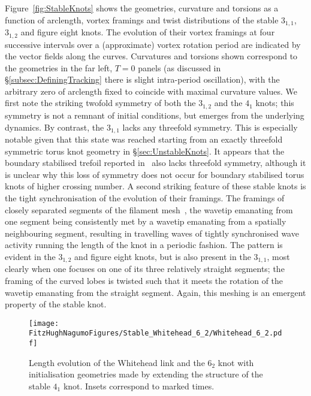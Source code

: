 Figure~\ref{fig:StableKnots} shows the geometries, curvature and torsions as a function of arclength, vortex framings and twist distributions of the stable $3_{1,1}$, $3_{1,2}$ and figure eight knots. The evolution of their vortex framings at four successive intervals over a (approximate) vortex rotation period are indicated by the vector fields along the curves. Curvatures and torsions shown correspond to the geometries in the far left, $T=0$ panels (as discussed in \S \ref{subsec:DefiningTracking} there is slight intra-period oscillation), with the arbitrary zero of arclength fixed to coincide with maximal curvature values. We first note the striking twofold symmetry of both the $3_{1,2}$ and the $4_1$ knots; this symmetry is not a remnant of initial conditions, but emerges from the underlying dynamics. By contrast, the $3_{1,1}$ lacks any threefold symmetry. This is especially notable given that this state was reached starting from an exactly threefold symmetric torus knot geometry in \S \ref{sec:UnstableKnots}. It appears that the boundary stabilised trefoil reported in~\citep{Maucher2017} also lacks threefold symmetry, although it is unclear why this loss of symmetry does not occur for boundary stabilised torus knots of higher crossing number. A second striking feature of these stable knots is the tight synchronisation of the evolution of their framings. The framings of closely separated segments of the filament mesh~\citep{Henze1993}, the wavetip emanating from one segment being consistently met by a wavetip emanating from a spatially neighbouring segment, resulting in travelling waves of tightly synchronised wave activity running the length of the knot in a periodic fashion. The pattern is evident in the $3_{1,2}$ and figure eight knots, but is also present in the $3_{1,1}$, most clearly when one focuses on one of its three relatively straight segments; the framing of the curved lobes is twisted such that it meets the rotation of the wavetip emanating from the straight segment. Again, this meshing is an emergent property of the stable knot. 
\begin{figure}[htbp]
\centering
    \texttt{[image: \\FitzHughNagumoFigures/Stable\_Whitehead\_6\_2/Whitehead\_6\_2.pdf]}
    \caption[Length evolution of novel stable knots.]{Length evolution of the Whitehead link and the $6_2$ knot with initialisation geometries made by extending the structure of the stable $4_1$ knot. Insets correspond to marked times.}
\label{fig:Whitehead_6_2}
\end{figure}

